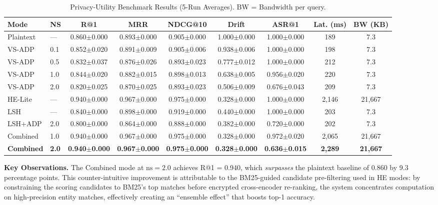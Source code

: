 \documentclass[conference]{IEEEtran}
\begin{document}
\begin{table}[t]
\centering
\caption{Privacy-Utility Benchmark Results (5-Run Averages). BW = Bandwidth per query.}
\label{tab:main_results}
\begin{tabular}{@{}llccccccc@{}}
\toprule
\textbf{Mode} & \textbf{NS} & \textbf{R@1} & \textbf{MRR} & \textbf{NDCG@10} & \textbf{Drift} & \textbf{ASR@1} & \textbf{Lat. (ms)} & \textbf{BW (KB)} \\
\midrule
Plaintext & --- & 0.860$\pm$0.000 & 0.893$\pm$0.000 & 0.905$\pm$0.000 & 1.000$\pm$0.000 & 1.000$\pm$0.000 & 189 & 7.3 \\
\midrule
VS-ADP & 0.1 & 0.852$\pm$0.020 & 0.891$\pm$0.009 & 0.905$\pm$0.006 & 0.938$\pm$0.006 & 1.000$\pm$0.000 & 198 & 7.3 \\
VS-ADP & 0.5 & 0.832$\pm$0.037 & 0.876$\pm$0.026 & 0.893$\pm$0.023 & 0.777$\pm$0.012 & 1.000$\pm$0.000 & 212 & 7.3 \\
VS-ADP & 1.0 & 0.844$\pm$0.020 & 0.882$\pm$0.015 & 0.898$\pm$0.013 & 0.638$\pm$0.005 & 0.956$\pm$0.020 & 220 & 7.3 \\
VS-ADP & 2.0 & 0.820$\pm$0.025 & 0.870$\pm$0.025 & 0.893$\pm$0.023 & 0.506$\pm$0.009 & 0.676$\pm$0.043 & 209 & 7.3 \\
\midrule
HE-Lite & --- & 0.940$\pm$0.000 & 0.967$\pm$0.000 & 0.975$\pm$0.000 & 0.328$\pm$0.000 & 1.000$\pm$0.000 & 2,146 & 21,667 \\
\midrule
LSH & --- & 0.840$\pm$0.000 & 0.898$\pm$0.000 & 0.919$\pm$0.000 & 0.440$\pm$0.000 & 1.000$\pm$0.000 & 203 & 7.3 \\
LSH+ADP & 2.0 & 0.800$\pm$0.000 & 0.864$\pm$0.000 & 0.888$\pm$0.000 & 0.382$\pm$0.000 & 0.720$\pm$0.000 & 202 & 7.3 \\
\midrule
Combined & 1.0 & 0.940$\pm$0.000 & 0.967$\pm$0.000 & 0.975$\pm$0.000 & 0.328$\pm$0.000 & 0.972$\pm$0.020 & 2,065 & 21,667 \\
\textbf{Combined} & \textbf{2.0} & \textbf{0.940$\pm$0.000} & \textbf{0.967$\pm$0.000} & \textbf{0.975$\pm$0.000} & \textbf{0.328$\pm$0.000} & \textbf{0.636$\pm$0.015} & \textbf{2,289} & \textbf{21,667} \\
\bottomrule
\end{tabular}
\end{table}

\textbf{Key Observations.} The Combined mode at $\text{ns}=2.0$ achieves R@1 = 0.940, which \textit{surpasses} the plaintext baseline of 0.860 by 9.3 percentage points. This counter-intuitive improvement is attributable to the BM25-guided candidate pre-filtering used in HE modes: by constraining the scoring candidates to BM25's top matches before encrypted cross-encoder re-ranking, the system concentrates computation on high-precision entity matches, effectively creating an ``ensemble effect'' that boosts top-1 accuracy.
\end{document}
